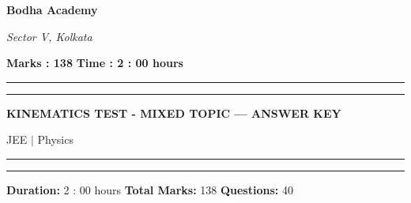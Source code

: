 \documentclass[11pt,a4paper]{article}
\begin{document}
{\centering \large \textbf{Bodha Academy}\par}
{\centering \small \textit{Sector V, Kolkata}\par}
\vspace{2mm}
\noindent \textbf{Marks : 138} \hfill \textbf{Time : 2 : 00 hours}
\noindent\rule{\linewidth}{1.1pt}\vspace{-1mm}\noindent\rule{\linewidth}{0.5pt}
{\centering \Large \textbf{KINEMATICS TEST - MIXED TOPIC --- ANSWER KEY}\par}
{\centering JEE $|$ Physics\par}
\noindent\rule{\linewidth}{1.1pt}\vspace{-1mm}\noindent\rule{\linewidth}{0.5pt}
\vspace{1mm}
\noindent \textbf{Duration:} 2 : 00 hours \quad \textbf{Total Marks:} 138 \quad \textbf{Questions:} 40\par
\vspace{2mm}
\end{document}
